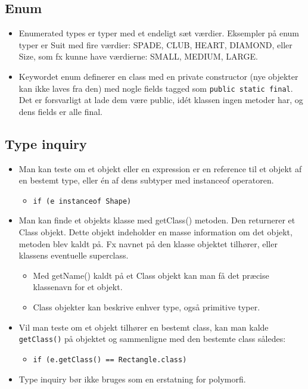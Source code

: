\subsection{Enum}

\begin{itemize}
  \item Enumerated types er typer med et endeligt sæt værdier. Eksempler på enum typer er Suit med fire værdier: SPADE, CLUB, HEART, DIAMOND, eller Size, som fx kunne have værdierne: SMALL, MEDIUM, LARGE.
  \item Keywordet enum definerer en class med en private constructor (nye objekter kan ikke laves fra den) med nogle fields tagged som \verb|public static final|. Det er forsvarligt at lade dem være public, idét klassen ingen metoder har, og dens fields er alle final.
\end{itemize}

\subsection{Type inquiry}

\begin{itemize}
  \item Man kan teste om et objekt eller en expression er en reference til et objekt af en bestemt type, eller én af dens subtyper med instanceof operatoren.
  \begin{itemize}
    \item \verb|if (e instanceof Shape)|
  \end{itemize}

  \item Man kan finde et objekts klasse med getClass() metoden. Den returnerer et Class objekt. Dette objekt indeholder en masse information om det objekt, metoden blev kaldt på. Fx navnet på den klasse objektet tilhører, eller klassens eventuelle superclass.
  \begin{itemize}
    \item Med getName() kaldt på et Class objekt kan man få det præcise klassenavn for et objekt.
    \item Class objekter kan beskrive enhver type, også primitive typer.
  \end{itemize}

  \item Vil man teste om et objekt tilhører en bestemt class, kan man kalde \verb|getClass()| på objektet og sammenligne med den bestemte class således:
  \begin{itemize}
    \item \verb|if (e.getClass() == Rectangle.class)|
  \end{itemize}

  \item Type inquiry bør ikke bruges som en erstatning for polymorfi.
\end{itemize}

